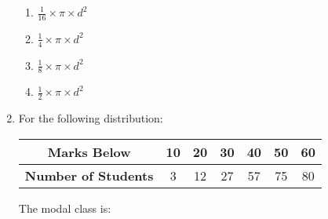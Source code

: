 \documentclass{article}
\begin{document}
\begin{enumerate}
\begin{enumerate}
    \item \(\frac{1}{16} \times \pi \times d^2\)
    \item \(\frac{1}{4} \times \pi \times d^2\)
    \item \(\frac{1}{8} \times \pi \times d^2\)
    \item \(\frac{1}{2} \times \pi \times d^2\)
\end{enumerate}
\item For the following distribution:

\begin{center}
\begin{tabular}{|c|c|c|c|c|c|c|}
\hline
\textbf{Marks Below} & 10 & 20 & 30 & 40 & 50 & 60 \\
\hline
\textbf{Number of Students} & 3 & 12 & 27 & 57 & 75 & 80 \\
\hline
\end{tabular}
\end{center}

The modal class is:


\end{enumerate}
\end{document}
